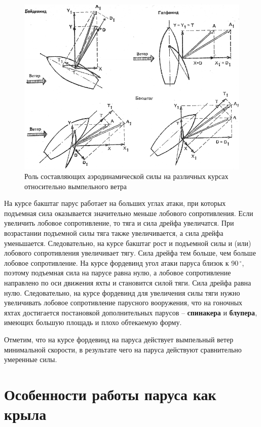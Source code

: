 \documentclass[a4paper, 12pt, twoside, final, book, russian, fittopage, cyremdash]{ncc}
\newcommand{\gr}{\ensuremath{\,^\circ}\xspace}
\begin{document}
\begin{figure}[htb]
  \centering
  \includegraphics[scale=1.3]{0020P}
  \caption{Роль составляющих аэродинамической силы на различных курсах относительно вымпельного ветра}
  \label{fig:20}
\end{figure}

На курсе бакштаг парус работает на больших углах атаки, при которых подъемная сила оказывается значительно меньше лобового сопротивления. Если увеличить лобовое сопротивление, то тяга и сила дрейфа увеличатся. При возрастании подъемной силы тяга также увеличивается, а сила дрейфа уменьшается. Следовательно, на курсе бакштаг рост и подъемной силы и (или) лобового сопротивления увеличивает тягу. Сила дрейфа тем больше, чем больше лобовое сопротивление. На курсе фордевинд угол атаки паруса близок к 90\gr, поэтому подъемная сила на парусе равна нулю, а лобовое сопротивление направлено по оси движения яхты и становится силой тяги. Сила дрейфа равна нулю. Следовательно, на курсе фордевинд для увеличения силы тяги нужно увеличивать лобовое сопротивление парусного вооружения, что на гоночных яхтах достигается постановкой дополнительных парусов \--- \textbf{спинакера} и \textbf{блупера}, имеющих большую площадь и плохо обтекаемую форму. 

Отметим, что на курсе фордевинд на паруса действует вымпельный ветер минимальной скорости, в результате чего на паруса действуют сравнительно умеренные силы.

\section{Особенности работы паруса как крыла}
\end{document}
